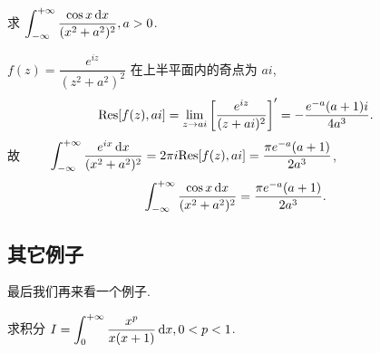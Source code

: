 \begin{example}
	求 $\displaystyle\int_{-\infty}^{+\infty}\frac{\cos x\,\mathrm{d} x}{(x^2+a^2)^2}, a>0$.
\end{example}

\begin{solution}
	$f(z)=\dfrac{e^{iz}}{(z^2+a^2)^2}$ 在上半平面内的奇点为 $ai$,
	{
		\[{\mathrm{Res}}[f(z),ai]=\lim_{z\to ai}\left[\frac{e^{iz}}{(z+ai)^2}\right]'=-\frac{e^{-a}(a+1)i}{4a^3}.\]故
		$\displaystyle\qquad \int_{-\infty}^{+\infty}\frac{e^{ix}\,\mathrm{d} x}{(x^2+a^2)^2}=2\pi i {\mathrm{Res}}[f(z),ai]=\frac{\pi e^{-a}(a+1)}{2a^3}$,
		\[\int_{-\infty}^{+\infty}\frac{\cos x\,\mathrm{d} x}{(x^2+a^2)^2}=\frac{\pi e^{-a}(a+1)}{2a^3}.\]
	}
\end{solution}

\subsection{其它例子}

最后我们再来看一个例子.

\begin{example}
	求积分 $I=\displaystyle\int_0^{+\infty}\frac{x^p}{x(x+1)}\,\mathrm{d} x,0<p<1$.
\end{example}

